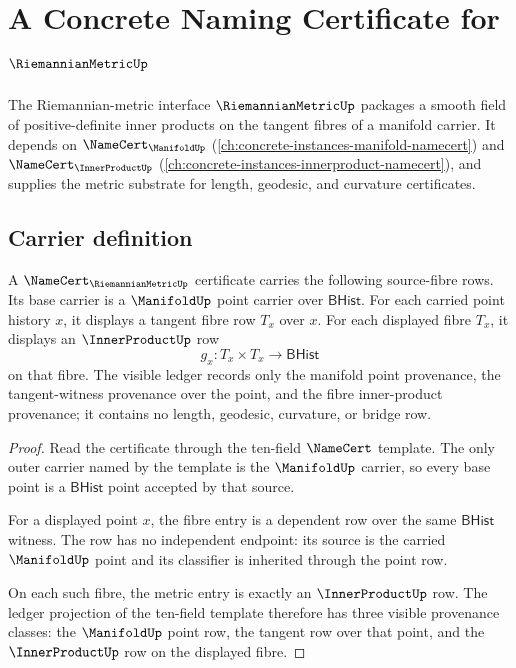\chapter{A Concrete Naming Certificate for $\RiemannianMetricUp$}
\label{ch:concrete-instances-riemannianmetric-namecert}

The Riemannian-metric interface $\RiemannianMetricUp$ packages a smooth field of positive-definite inner products on the tangent fibres of a manifold carrier. It depends on $\NameCert_{\ManifoldUp}$ (\autoref{ch:concrete-instances-manifold-namecert}) and $\NameCert_{\InnerProductUp}$ (\autoref{ch:concrete-instances-innerproduct-namecert}), and supplies the metric substrate for length, geodesic, and curvature certificates.

\section{Carrier definition}
\label{sec:riemannianmetric-carrier}

\begin{theorem}
\label{thm:riemannianmetric-source-fibre-carrier-row}
A $\NameCert_{\RiemannianMetricUp}$ certificate carries the following
source-fibre rows. Its base carrier is a $\ManifoldUp$ point carrier over
$\mathsf{BHist}$. For each carried point history $x$, it displays a tangent
fibre row $T_x$ over $x$. For each displayed fibre $T_x$, it displays an
$\InnerProductUp$ row
$$
g_x:T_x\times T_x\to \mathsf{BHist}
$$
on that fibre. The visible ledger records only the manifold point provenance,
the tangent-witness provenance over the point, and the fibre inner-product
provenance; it contains no length, geodesic, curvature, or bridge row.
\end{theorem}
\begin{proof}
Read the certificate through the ten-field $\NameCert$ template. The only
outer carrier named by the template is the $\ManifoldUp$ carrier, so every
base point is a $\mathsf{BHist}$ point accepted by that source.

For a displayed point $x$, the fibre entry is a dependent row over the same
$\mathsf{BHist}$ witness. The row has no independent endpoint: its source is
the carried $\ManifoldUp$ point and its classifier is inherited through the
point row.

On each such fibre, the metric entry is exactly an $\InnerProductUp$ row. The
ledger projection of the ten-field template therefore has three visible
provenance classes: the $\ManifoldUp$ point row, the tangent row over that
point, and the $\InnerProductUp$ row on the displayed fibre.
\end{proof}

